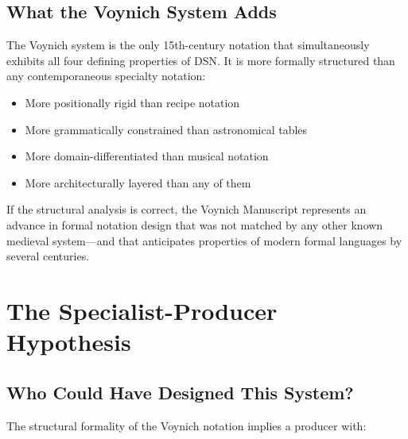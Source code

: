\documentclass[11pt,a4paper,twocolumn]{article}
\begin{document}
\subsection{What the Voynich System Adds}

The Voynich system is the only 15th-century notation that simultaneously exhibits all four defining properties of DSN. It is more formally structured than any contemporaneous specialty notation:

\begin{itemize}[leftmargin=*,itemsep=2pt]
    \item More positionally rigid than recipe notation
    \item More grammatically constrained than astronomical tables
    \item More domain-differentiated than musical notation
    \item More architecturally layered than any of them
\end{itemize}

\noindent If the structural analysis is correct, the Voynich Manuscript represents an advance in formal notation design that was not matched by any other known medieval system---and that anticipates properties of modern formal languages by several centuries.

\section{The Specialist-Producer Hypothesis}
\label{sec:specialist}

\subsection{Who Could Have Designed This System?}

The structural formality of the Voynich notation implies a producer with:
\end{document}
